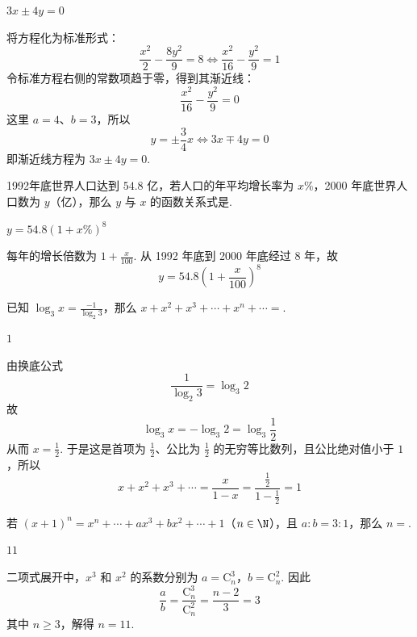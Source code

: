 \begin{answer}
\(3x\pm4y=0\)
\end{answer}

\begin{solution}
将方程化为标准形式：
\[
\frac{x^2}{2}-\frac{8y^2}{9}=8
\iff \frac{x^2}{16}-\frac{y^2}{9}=1
\]
令标准方程右侧的常数项趋于零，得到其渐近线：
\[
\frac{x^2}{16}-\frac{y^2}{9}=0
\]
这里 \(a=4\)、\(b=3\)，所以
\[
y=\pm\frac{3}{4}x\iff 3x\mp4y=0
\]
即渐近线方程为 \(3x\pm4y=0\).
\end{solution}

\begin{problem}
1992年底世界人口达到 \(54.8\text{ 亿}\)，若人口的年平均增长率为 \(x\%\)，2000 年底世界人口数为 \(y\)（亿），那么 \(y\) 与 \(x\) 的函数关系式是\fillinblank{}.
\end{problem}

\begin{answer}
\(y=54.8(1+x\%)^8\)
\end{answer}

\begin{solution}
每年的增长倍数为 \(1+\frac{x}{100}\). 从 1992 年底到 2000 年底经过 \(8\) 年，故
\[
y=54.8\left(1+\frac{x}{100}\right)^8
\]
\end{solution}

\begin{problem}
已知 \(\log_3 x=\frac{-1}{\log_2 3}\)，那么 \(x+x^2+x^3+\cdots+x^n+\cdots=\)\fillinblank{}.
\end{problem}

\begin{answer}
\(1\)
\end{answer}

\begin{solution}
由换底公式
\[
\frac{1}{\log_2 3}=\log_3 2
\]
故
\[
\log_3x=-\log_3 2=\log_3\frac12
\]
从而 \(x=\frac12\). 于是这是首项为 \(\frac12\)、公比为 \(\frac12\) 的无穷等比数列，且公比绝对值小于 \(1\)，所以
\[
x+x^2+x^3+\cdots=\frac{x}{1-x}=\frac{\frac{1}{2}}{1-\frac{1}{2}}=1
\]
\end{solution}

\begin{problem}
若 \((x+1)^n=x^n+\cdots+ax^3+bx^2+\cdots+1\)（\(n\in\N\)），且 \(a:b=3:1\)，那么 \(n=\)\fillinblank{}.
\end{problem}

\begin{answer}
\(11\)
\end{answer}

\begin{solution}
二项式展开中，\(x^3\) 和 \(x^2\) 的系数分别为
\(a=\mathrm C_n^3\)，\(b=\mathrm C_n^2\).
因此
\[
\frac{a}{b}=\frac{\mathrm C_n^3}{\mathrm C_n^2}=\frac{n-2}{3}=3
\]
其中 \(n\geqslant3\)，解得 \(n=11\).
\end{solution}

